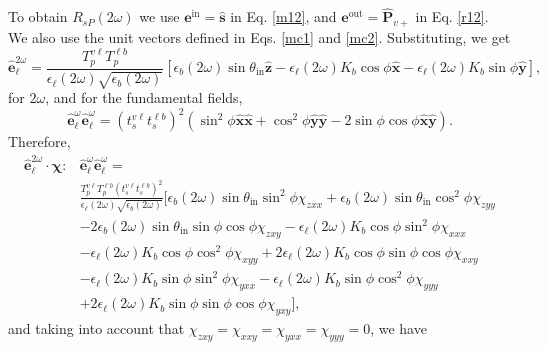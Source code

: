 To obtain $R_{sP}(2\omega)$ we use $\mathbf{e}^{\mathrm{in}}=\hat{\mathbf{s}}$
in Eq. \eqref{m12}, and $\mathbf{e}^{\mathrm{out}}=\hat{\mathbf{P}}_{v+}$ in
Eq. \eqref{r12}. We also use the unit vectors defined in Eqs. \eqref{mc1} and
\eqref{mc2}. Substituting, we get
\begin{equation*}
\hat{\mathbf{e}}^{2\omega}_{\ell} 
= \frac{T^{v\ell}_{p}T^{\ell b}_{p}}
       {\epsilon_{\ell}(2\omega)\sqrt{\epsilon_{b}(2\omega)}}
\left[
  \epsilon_{b}(2\omega)\sin\theta_{\mathrm{in}}\hat{\mathbf{z}} 
- \epsilon_{\ell}(2\omega)K_{b}\cos\phi\hat{\mathbf{x}} 
- \epsilon_{\ell}(2\omega)K_{b}\sin\phi\hat{\mathbf{y}}
\right],
\end{equation*}
for $2\omega$, and for the fundamental fields,
\begin{equation*}
\hat{\mathbf{e}}^{\omega}_{\ell}\hat{\mathbf{e}}^{\omega}_{\ell}
= \left(t^{v\ell}_{s}t^{\ell b}_{s}\right)^{2}
\left(
  \sin^{2}\phi\hat{\mathbf{x}}\hat{\mathbf{x}}
+ \cos^{2}\phi\hat{\mathbf{y}}\hat{\mathbf{y}} 
- 2\sin\phi\cos\phi\hat{\mathbf{x}}\hat{\mathbf{y}}
\right).
\end{equation*}
Therefore,
\begin{equation*}
\begin{split}
\hat{\mathbf{e}}^{2\omega}_{\ell}
\cdot\boldsymbol{\chi}:&
\hat{\mathbf{e}}^{\omega}_{\ell}\hat{\mathbf{e}}^{\omega}_{\ell} =\\
&\frac{T^{v\ell}_{p}T^{\ell b}_{p}\left(t^{v\ell}_{s}t^{\ell b}_{s}\right)^{2}}
      {\epsilon_{\ell}(2\omega)\sqrt{\epsilon_{b}(2\omega)}}
\big[
   \epsilon_{b}(2\omega)\sin\theta_{\mathrm{in}}\sin^{2}\phi\chi_{zxx} 
 + \epsilon_{b}(2\omega)\sin\theta_{\mathrm{in}}\cos^{2}\phi\chi_{zyy}\\
&- 2\epsilon_{b}(2\omega)\sin\theta_{\mathrm{in}}\sin\phi\cos\phi\chi_{zxy}
 - \epsilon_{\ell}(2\omega)K_{b}\cos\phi\sin^{2}\phi\chi_{xxx}\\
&- \epsilon_{\ell}(2\omega)K_{b}\cos\phi\cos^{2}\phi\chi_{xyy}
 + 2\epsilon_{\ell}(2\omega)K_{b}\cos\phi\sin\phi\cos\phi\chi_{xxy}\\
&- \epsilon_{\ell}(2\omega)K_{b}\sin\phi\sin^{2}\phi\chi_{yxx}
 - \epsilon_{\ell}(2\omega)K_{b}\sin\phi\cos^{2}\phi\chi_{yyy}\\
&+ 2\epsilon_{\ell}(2\omega)K_{b}\sin\phi\sin\phi\cos\phi\chi_{yxy}
\big],
\end{split}
\end{equation*}
and taking into account that $\chi_{zxy} = \chi_{xxy} = \chi_{yxx} = \chi_{yyy}
= 0$, we have
